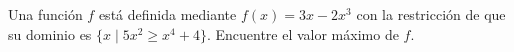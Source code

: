 \item Una función $f$ está definida mediante $f(x) = 3x - 2x^3$ con la restricción de que su dominio es $\{x \mid 5x^2 \ge x^4 + 4\}$. Encuentre el valor máximo de $f$.
